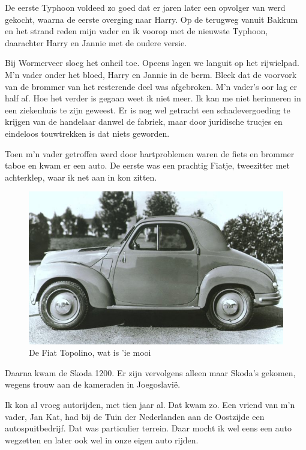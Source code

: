 \documentclass[12pt,twoside, openright]{memoir}
\begin{document}
De eerste Typhoon voldeed zo goed dat er jaren later een opvolger van werd gekocht, waarna de eerste overging naar Harry. Op de terugweg vanuit Bakkum en het strand reden mijn vader en ik voorop met de nieuwste Typhoon, daarachter Harry en Jannie met de oudere versie. 

Bij Wormerveer sloeg het onheil toe. Opeens lagen we languit op het rijwielpad. M'n vader onder het bloed, Harry en Jannie in de berm. Bleek dat de voorvork van de brommer van het resterende deel was afgebroken. M'n vader's oor lag er half af. Hoe het verder is gegaan weet ik niet meer. Ik kan me niet herinneren in een ziekenhuis te zijn geweest. Er is nog wel getracht een schadevergoeding te krijgen van de handelaar danwel de fabriek, maar door juridische trucjes en eindeloos touwtrekken is dat niets geworden. 

Toen m'n vader getroffen werd door hartproblemen waren de fiets en brommer taboe en kwam er een auto. De eerste was een prachtig Fiatje, tweezitter met achterklep, waar ik net aan in kon zitten. 

\begin{figure}
\centering
\includegraphics[width=\textwidth]{img/111Fiat-Topolino.jpg}
\caption*{\footnotesize De Fiat Topolino, wat is 'ie mooi}
\end{figure}

Daarna kwam de Skoda 1200. Er zijn vervolgens alleen maar Skoda's gekomen, wegens trouw aan de kameraden in Joegoslavië. 

Ik kon al vroeg autorijden, met tien jaar al. Dat kwam zo. Een vriend van m'n vader, Jan Kat, had bij de Tuin der Nederlanden aan de Oostzijde een autospuitbedrijf. Dat was particulier terrein. Daar mocht ik wel eens een auto wegzetten en later ook wel in onze eigen auto rijden. 
\end{document}
